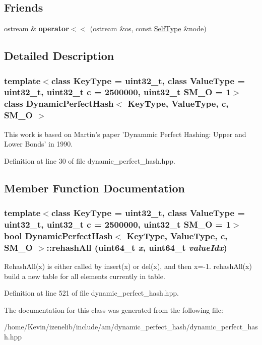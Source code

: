 \subsection*{Friends}
\begin{CompactItemize}
\item 
\hypertarget{classDynamicPerfectHash_d6b3ef7ecb2e9975d8022514f68f74f5}{
ostream \& \textbf{operator$<$$<$} (ostream \&os, const \hyperlink{classDynamicPerfectHash}{SelfType} \&node)}
\label{classDynamicPerfectHash_d6b3ef7ecb2e9975d8022514f68f74f5}

\end{CompactItemize}


\subsection{Detailed Description}
\subsubsection*{template$<$class KeyType = uint32\_\-t, class ValueType = uint32\_\-t, uint32\_\-t c = 2500000, uint32\_\-t SM\_\-O = 1$>$ class DynamicPerfectHash$<$ KeyType, ValueType, c, SM\_\-O $>$}

This work is based on Martin's paper 'Dynammic Perfect Hashing: Upper and Lower Bonds' in 1990. 

Definition at line 30 of file dynamic\_\-perfect\_\-hash.hpp.

\subsection{Member Function Documentation}
\hypertarget{classDynamicPerfectHash_cdbb7a3af80d78ba2e400c531ae8319b}{
\subsubsection[{rehashAll}]{\setlength{\rightskip}{0pt plus 5cm}template$<$class KeyType  = uint32\_\-t, class ValueType  = uint32\_\-t, uint32\_\-t c = 2500000, uint32\_\-t SM\_\-O = 1$>$ bool {\bf DynamicPerfectHash}$<$ KeyType, ValueType, c, SM\_\-O $>$::rehashAll (uint64\_\-t {\em x}, \/  uint64\_\-t {\em valueIdx})}}
\label{classDynamicPerfectHash_cdbb7a3af80d78ba2e400c531ae8319b}


RehashAll(x) is either called by insert(x) or del(x), and then x=-1. rehashAll(x) build a new table for all elements currently in table. 

Definition at line 521 of file dynamic\_\-perfect\_\-hash.hpp.

The documentation for this class was generated from the following file:\begin{CompactItemize}
\item 
/home/Kevin/izenelib/include/am/dynamic\_\-perfect\_\-hash/dynamic\_\-perfect\_\-hash.hpp\end{CompactItemize}
